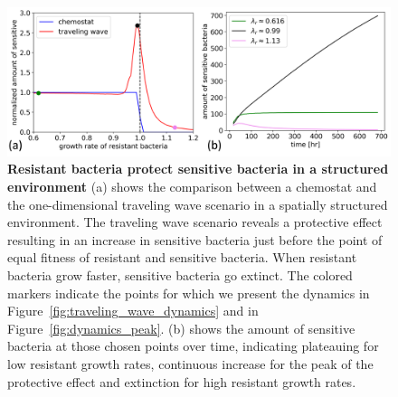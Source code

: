 \begin{figure}
\centering
\includegraphics[width=\linewidth]{graphics/2025_09_30_phages_fig5.png}
\caption{\textbf{Resistant bacteria protect sensitive bacteria in a structured environment} (a) shows the comparison between a chemostat and the one-dimensional traveling wave scenario in a spatially structured environment. The traveling wave scenario reveals a protective effect resulting in an increase in sensitive bacteria just before the point of equal fitness of resistant and sensitive bacteria. When resistant bacteria grow faster, sensitive bacteria go extinct. The colored markers indicate the points for which we present the dynamics in Figure~\ref{fig:traveling_wave_dynamics} and in Figure~\ref{fig:dynamics_peak}. (b) shows the amount of sensitive bacteria at those chosen points over time, indicating plateauing for low resistant growth rates, continuous increase for the peak of the protective effect and extinction for high resistant growth rates.}
\label{fig:protective_effect}
\end{figure}

